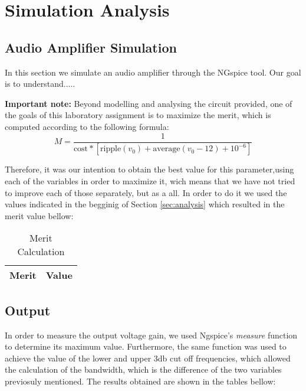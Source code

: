 \section{Simulation Analysis}
\label{sec:simulation}

\subsection{Audio Amplifier Simulation}
\label{subsec:amp_simulation}
\par In this section we simulate an audio amplifier through the NGspice tool. Our goal is to understand.....

\par  \textbf{Important note:} Beyond modelling and analysing the circuit provided, one of the goals of this laboratory assignment is to maximize the merit, which is computed according to the following formula:
\begin{equation}
M = \frac{1}{\text{cost}*[\text{ripple}(v_0)+\text{average}(v_{0}-12)+10^{-6}]}
\end{equation}

Therefore, it was our intention to obtain the best value for this parameter,using each of the variables in order to maximize it, wich means that we have not tried to improve each of those separately, but as a all.
In order to do it we used the values indicated in the begginig of Section \ref{sec:analysis} which resulted in the merit value bellow:

\begin{table}[H]
  \centering
  \begin{tabular}{ | m{11cm} | m{3cm}| } 
    \hline    
    {\bf Merit} & {\bf Value} \\ \hline
    
  \end{tabular}
  \caption{Merit Calculation}
  \label{tab:merit}
\end{table}

\subsection{Output}
\label{output_simulation}
\par In order to measure the output voltage gain, we used Ngspice's \textit{measure} function to determine its maximum value. Furthermore, the same function was used to achieve the value of the lower and upper 3db cut off frequencies, which allowed the calculation of the bandwidth, which is the difference of the two variables previosuly mentioned. The results obtained are shown in the tables bellow:

